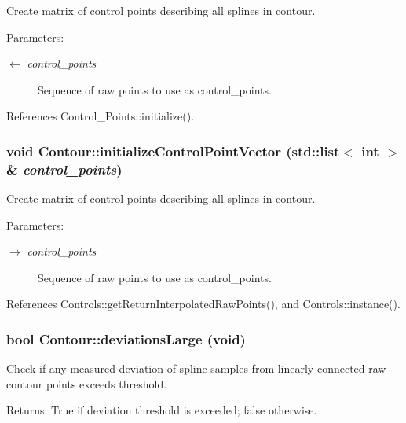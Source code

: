 Create matrix of control points describing all splines in contour. \begin{Desc}
\item[Parameters:]
\begin{description}
\item[\mbox{$\leftarrow$} {\em control\_\-points}]Sequence of raw points to use as control\_\-points. \end{description}
\end{Desc}


References Control\_\-Points::initialize().\hypertarget{classContour_2edee74efc68a14664ba378010e59a80}{
\subsubsection[initializeControlPointVector]{\setlength{\rightskip}{0pt plus 5cm}void Contour::initializeControlPointVector (std::list$<$ int $>$ \& {\em control\_\-points})}}
\label{classContour_2edee74efc68a14664ba378010e59a80}


Create matrix of control points describing all splines in contour. \begin{Desc}
\item[Parameters:]
\begin{description}
\item[\mbox{$\rightarrow$} {\em control\_\-points}]Sequence of raw points to use as control\_\-points. \end{description}
\end{Desc}


References Controls::getReturnInterpolatedRawPoints(), and Controls::instance().\hypertarget{classContour_5ab12f5bbf33221b340fda2d3c244b27}{
\subsubsection[deviationsLarge]{\setlength{\rightskip}{0pt plus 5cm}bool Contour::deviationsLarge (void)}}
\label{classContour_5ab12f5bbf33221b340fda2d3c244b27}


Check if any measured deviation of spline samples from linearly-connected raw contour points exceeds threshold. \begin{Desc}
\item[Returns:]True if deviation threshold is exceeded; false otherwise. \end{Desc}


